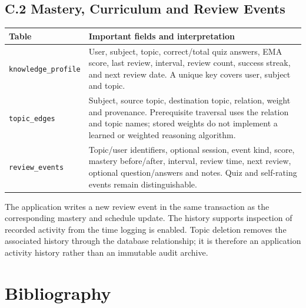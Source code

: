 \documentclass[11pt, a4paper, oneside]{report}
\begin{document}
\section*{C.2 Mastery, Curriculum and Review Events}
\begin{longtable}{@{}p{3.8cm} p{8.6cm}@{}}
\toprule
\textbf{Table} & \textbf{Important fields and interpretation} \\
\midrule
\endhead
\texttt{knowledge\_profile} & User, subject, topic, correct/total quiz answers, EMA score, last review, interval, review count, success streak, and next review date. A unique key covers user, subject and topic. \\[5pt]
\texttt{topic\_edges} & Subject, source topic, destination topic, relation, weight and provenance. Prerequisite traversal uses the relation and topic names; stored weights do not implement a learned or weighted reasoning algorithm. \\[5pt]
\texttt{review\_events} & Topic/user identifiers, optional session, event kind, score, mastery before/after, interval, review time, next review, optional question/answers and notes. Quiz and self-rating events remain distinguishable. \\
\bottomrule
\end{longtable}

The application writes a new review event in the same transaction as the corresponding mastery and schedule update. The history supports inspection of recorded activity from the time logging is enabled. Topic deletion removes the associated history through the database relationship; it is therefore an application activity history rather than an immutable audit archive.

\chapter*{Bibliography}
\end{document}
